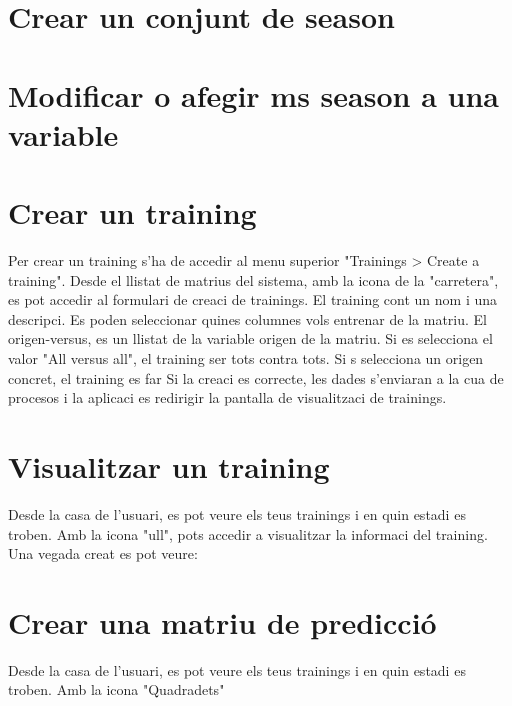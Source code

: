 \section{Crear un conjunt de season}

\section{Modificar o afegir ms season a una variable}

\section{Crear un training}
Per crear un training s'ha de accedir al menu superior "Trainings > Create a training". Desde el llistat de matrius del sistema, amb la icona de la "carretera", es pot accedir al formulari de creaci de trainings.
El training cont un nom i una descripci. Es poden seleccionar quines columnes vols entrenar de la matriu. 
El origen-versus, es un llistat de la variable origen de la matriu. Si es selecciona el valor "All versus all", el training ser tots contra tots. Si s selecciona un origen concret, el training es far
Si la creaci \´e{s} correcte, les dades s'enviaran a la cua de procesos i la aplicaci es redirigir la pantalla de visualitzaci de trainings.

\section{Visualitzar un training}
Desde la casa de l'usuari, es pot veure els teus trainings i en quin estadi es troben. Amb la icona "ull", pots accedir a visualitzar la informaci del training.
Una vegada creat es pot veure:
\begin{itemize}
\end{itemize}

\section{Crear una matriu de predicci\'{o}}
Desde la casa de l'usuari, es pot veure els teus trainings i en quin estadi es troben. Amb la icona "Quadradets"


